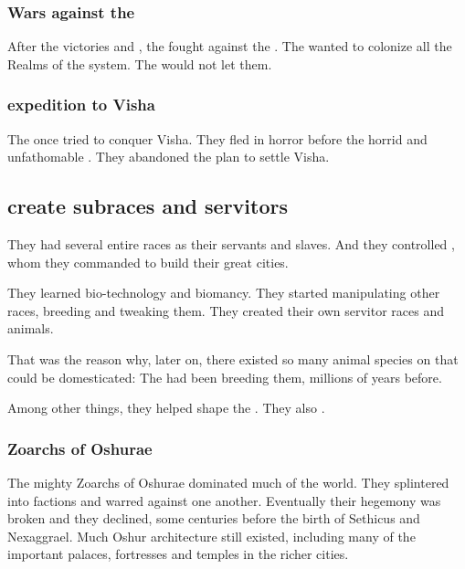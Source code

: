 \subsubsection{Wars against the \vorcanths}
After the victories  and , the \ophidians fought against the \vorcanths. 
The \ophidians wanted to colonize all the Realms of the system. 
The \vorcanths would not let them. 





\subsubsection{\Ophidian expedition to Visha}
The \ophidians once tried to conquer Visha.
They fled in horror before the horrid and unfathomable \moongods. 
They abandoned the plan to settle Visha. 









\subsection{\Ophidians create subraces and servitors}
They had several entire races as their servants and slaves. 
And they controlled \daemons{}, whom they commanded to build their great cities. 

They learned bio-technology and biomancy. 
They started manipulating other races, breeding and tweaking them. 
They created their own servitor races and animals. 

That was the reason why, later on, there existed so many animal species on \Miith{} that could be domesticated: 
The \ophidians{} had been breeding them, millions of years before. 

Among other things, they helped shape the . 
They also . 




\subsubsection{Zoarchs of Oshurae}
The mighty Zoarchs of Oshurae dominated much of the \caisith world. They splintered into factions and warred against one another. Eventually their hegemony was broken and they declined, some centuries before the birth of Sethicus and Nexaggrael. Much Oshur architecture still existed, including many of the important palaces, fortresses and temples in the richer cities. 

